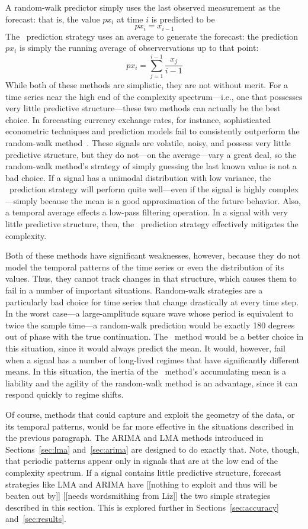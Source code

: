 A random-walk predictor simply uses the last observed measurement as
the forecast: that is, the value $px_i$ at time $i$ is predicted to
be $$px_i = x_{i-1}$$ The \naive ~prediction strategy uses an average
to generate the forecast: the prediction $px_i$ is simply the running
average of observervations up to that point: $$px_i =
\sum_{j=1}^{i-1}\frac{x_j}{i-1}$$ While both of these methods are
simplistic, they are not without merit.  For a time series near the
high end of the complexity spectrum---i.e., one that possesses very
little predictive structure---these two methods can actually be the
best choice.  In forecasting currency exchange rates, for instance,
sophisticated econometric techniques and prediction models fail to
consistently outperform the random-walk method~\cite{rwMeese,rwCCE}.
These signals are volatile, noisy, and possess very little predictive
structure, but they do not---on the average---vary a great deal, so
the random-walk method's strategy of simply guessing the last known
value is not a bad choice.  If a signal has a unimodal distribution
with low variance, the \naive ~prediction strategy will perform quite
well---even if the signal is highly complex---simply because the mean
is a good approximation of the future behavior.  Also, a temporal
average effects a low-pass filtering operation.  In a signal with very
little predictive structure, then, the \naive ~prediction strategy
effectively mitigates the complexity.

Both of these methods have significant weaknesses, however, because
they do not model the temporal patterns of the time series or even the
distribution of its values.  Thus, they cannot track changes in that
structure, which causes them to fail in a number of important
situations.  Random-walk strategies are a particularly bad choice for
time series that change drastically at every time step.  In the worst
case---a large-amplitude square wave whose period is equivalent to
twice the sample time---a random-walk prediction would be exactly 180
degrees out of phase with the true continuation.  The \naive ~method
would be a better choice in this situation, since it would always
predict the mean.  It would, however, fail when a signal has a number
of long-lived regimes that have significantly different means.  In
this situation, the inertia of the \naive ~method's accumulating mean
is a liability and the agility of the random-walk method is an
advantage, since it can respond quickly to regime shifts.

Of course, methods that could capture and exploit the geometry of the
data, or its temporal patterns, would be far more effective in the
situations described in the previous paragraph.  The ARIMA and LMA
methods introduced in Sections~\ref{sec:lma} and~\ref{sec:arima} are
designed to do exactly that.  Note, though, that periodic patterns
appear only in signals that are at the low end of the complexity
spectrum.  If a signal contains little predictive structure, forecast
strategies like LMA and ARIMA have [[nothing to exploit and thus will
    be beaten out by]] [[needs wordsmithing from Liz]] the two simple
strategies described in this section.  This is explored further in
Sections~\ref{sec:accuracy} and~\ref{sec:results}.


